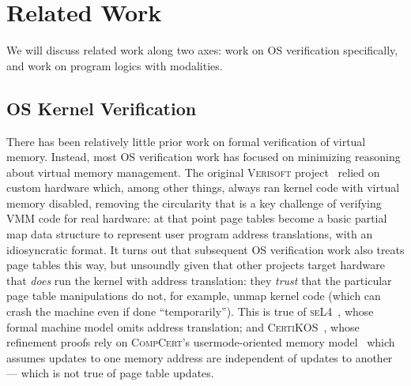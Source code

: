 \section{Related Work}
\label{sec:relwork}

We will discuss related work along two axes: work on OS verification specifically, and work on 
program logics with modalities.

\subsection{OS Kernel Verification}
There has been relatively little prior work on formal verification of virtual memory.
Instead, most OS verification work has focused on minimizing reasoning about virtual memory management.
The original \textsc{Verisoft} project~\cite{alkassar2008verisoft,alkassar2010pervasive,alkassar2008formal,dalinger2005verification,hillebrand2005address,alkassar2008formal,starostin2010formal} 
relied on custom hardware which, among other things, always ran kernel code with virtual memory disabled, removing the circularity that is a key challenge of verifying 
VMM code for real hardware: at that point page tables become a basic partial map data structure to represent user program address translations,
with an idiosyncratic format. It turns out that subsequent OS verification work also treats page tables this way, but
unsoundly given that other projects target hardware that \emph{does} run the kernel with address translation: they \emph{trust}
that the particular page table manipulations do not, for example, unmap kernel code (which can crash the machine even if done ``temporarily'').
This is true of \textsc{seL4}~\cite{Klein2009seL4,seL4TOCS,Sewell2013translation}, whose formal machine model omits address translation;
and \textsc{CertiKOS}~\cite{gu15,gu2016certikos,gu2018certikos,chen2016interrupts}, whose refinement proofs rely on
\textsc{CompCert}'s usermode-oriented memory model~\cite{leroy2008formal,leroy2009formally} which assumes
updates to one memory address are independent of updates to another ---
which is not true of page table updates.
